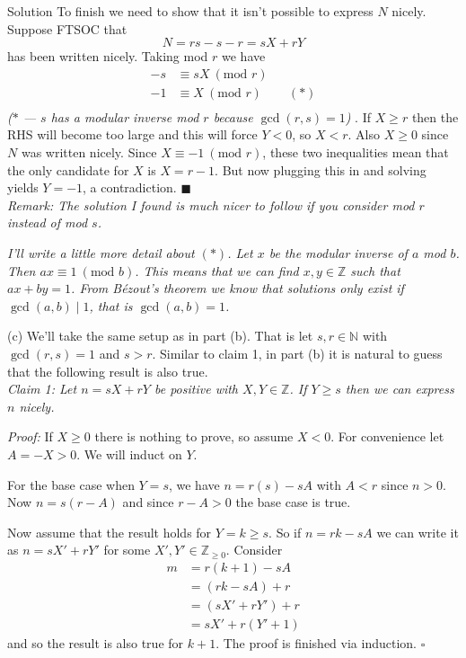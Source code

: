 \documentclass{article}
\begin{document}
\begin{solution}{Solution}
To finish we need to show that it isn't possible to express $N$ nicely.
Suppose FTSOC that
$$
N = rs - s - r = sX + rY
$$
has been written nicely. Taking mod $r$ we have
\[
\begin{aligned}
-s &\equiv sX \ (\text{mod } r) \\
-1 &\equiv X \ (\text{mod } r) && (*) \\
\end{aligned}
\]
\textit{($*$ --- $s$ has a modular inverse mod $r$ because $\gcd(r,s) = 1$)}
. If
$X \geq r$ then the RHS will become too large and this will force $Y < 0$,
so $X < r$. Also $X \geq 0$ since $N$ was written nicely. Since
$X \equiv -1 \ (\text{mod } r)$, these two inequalities mean that the only
candidate for $X$ is $X = r-1$. But now plugging this in and solving
yields $Y = -1$, a contradiction. $\blacksquare$ \\

\textit{Remark: The solution
I found is much nicer to follow if you consider mod $r$ instead of mod $s$.}
\vspace{0.2cm}

\textit{
I'll write a little more detail about $(*)$. Let $x$ be the modular
inverse of $a$ mod $b$. Then $ax \equiv 1 \ (\text{mod } b)$. This means
that we can find $x,y \in \mathbb{Z}$ such that $ax + by = 1$. From
Bézout's theorem we know that solutions only exist if $\gcd(a,b) \mid 1$,
that is $\gcd(a,b) = 1$.
}

\newpage
(c) We'll take the same setup as in part (b). That is let
$s,r \in \mathbb{N}$ with $\gcd(r,s) = 1$ and $s > r$.
Similar to claim
1, in part (b) it is natural to guess that the following result is also
true. \\

\textit{Claim 1: Let $n = sX + rY$ be positive with $X, Y \in \mathbb{Z}$.
If $Y \geq s$ then we can express $n$ nicely.}
\vspace{0.2cm}

\textit{Proof:} If $X \geq 0$ there is nothing to prove, so assume
$X < 0$. For convenience let $A = -X > 0$. We will induct on $Y$.
\vspace{0.2cm}

For the base case when $Y = s$, we have $n = r(s) - sA$ with $A < r$ since
$n > 0$. Now $n = s(r - A)$ and since $r-A > 0$ the base case is true.
\vspace{0.2cm}

Now assume that the result holds for $Y = k \geq s$. So if
$n = rk - sA$ we can write it as $n = sX' + rY'$ for some
$X', Y' \in \mathbb{Z}_{\geq 0}$. Consider
\[
\begin{aligned}
m &= r(k+1) - sA \\
&= (rk - sA) + r \\
&= (sX' + rY') + r \\
&= sX' + r(Y' + 1)
\end{aligned}
\]
and so the result is also true for $k+1$. The proof is finished via
induction. $\square$ \\


\end{solution}
\end{document}
